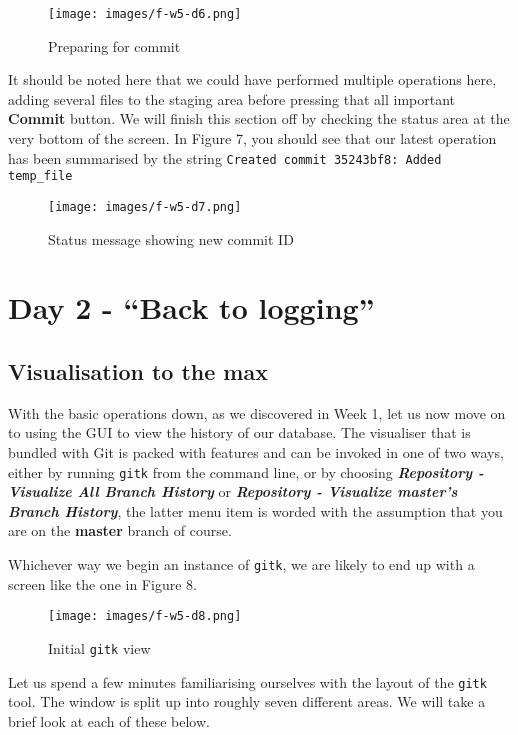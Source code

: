 \begin{figure}[hbt]
\centering
\texttt{[image: images/f-w5-d6.png]}
\caption{Preparing for commit}
\end{figure}

It should be noted here that we could have performed multiple operations here, adding several files to the staging area before pressing that all important \textbf{Commit} button.  We will finish this section off by checking the status area at the very bottom of the screen.  In Figure 7, you should see that our latest operation has been summarised by the string \texttt{Created commit 35243bf8: Added temp\_file}

\begin{figure}[hbt]
\centering
\texttt{[image: images/f-w5-d7.png]}
\caption{Status message showing new commit ID}
\end{figure}

\section{Day 2 - ``Back to logging''}
\subsection{Visualisation to the max}

With the basic operations down, as we discovered in Week 1, let us now move on to using the GUI to view the history of our database.  The visualiser that is bundled with Git is packed with features and can be invoked in one of two ways, either by running \texttt{gitk} from the command line, or by choosing \textbf{\emph{Repository - Visualize All Branch History}} or \textbf{\emph{Repository - Visualize master's Branch History}}, the latter menu item is worded with the assumption that you are on the \textbf{master} branch of course.

Whichever way we begin an instance of \texttt{gitk}, we are likely to end up with a screen like the one in Figure 8.

\begin{figure}[hbt]
\centering
\texttt{[image: images/f-w5-d8.png]}
\caption{Initial \texttt{gitk} view}
\end{figure} 

Let us spend a few minutes familiarising ourselves with the layout of the \texttt{gitk} tool.  The window is split up into roughly seven different areas.  We will take a brief look at each of these below.

